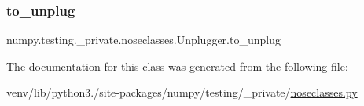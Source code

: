 \subsubsection{\texorpdfstring{to\+\_\+unplug}{to\_unplug}}
{\footnotesize\ttfamily numpy.\+testing.\+\_\+private.\+noseclasses.\+Unplugger.\+to\+\_\+unplug}



The documentation for this class was generated from the following file\+:\begin{DoxyCompactItemize}
\item 
venv/lib/python3./site-\/packages/numpy/testing/\+\_\+private/\hyperlink{noseclasses_8py}{noseclasses.\+py}\end{DoxyCompactItemize}
